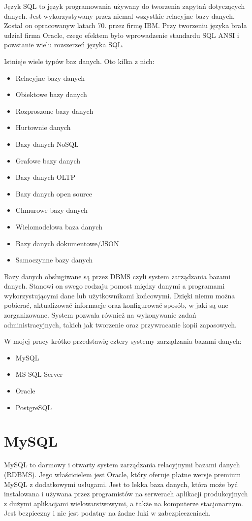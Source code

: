 \documentclass[oneside,polski,logo,indent]{amuthesis}
\begin{document}
Język SQL to język programowania używany do tworzenia zapytań dotyczących danych. Jest wykorzystywany przez niemal wszystkie relacyjne bazy danych. Został on opracowany\break w latach 70. przez firmę IBM. Przy tworzeniu języka brała udział firma Oracle, czego efektem było wprowadzenie standardu SQL ANSI i powstanie wielu rozszerzeń języka SQL.  

Istnieje wiele typów baz danych. Oto kilka z nich:  
\begin{itemize}
\item Relacyjne bazy danych
\item Obiektowe bazy danych
\item Rozproszone bazy danych
\item Hurtownie danych
\item Bazy danych NoSQL
\item Grafowe bazy danych
\item Bazy danych OLTP
\item Bazy danych open source
\item Chmurowe bazy danych
\item Wielomodelowa baza danych
\item Bazy danych dokumentowe/JSON
\item Samoczynne bazy danych
\end{itemize}

Bazy danych obsługiwane są przez DBMS czyli system zarządzania bazami danych. Stanowi on swego rodzaju pomost między danymi a programami wykorzystującymi dane lub użytkownikami końcowymi. Dzięki niemu można pobierać, aktualizować informacje oraz konfigurować sposób, w jaki są one zorganizowane. System pozwala również na wykonywanie zadań administracyjnych, takich jak tworzenie oraz przywracanie kopii zapasowych.


W mojej pracy krótko przedstawię cztery systemy zarządzania bazami danych: 
\begin{itemize}
\item MySQL 
\item MS SQL Server 
\item Oracle 
\item PostgreSQL 
\end{itemize}
\section{MySQL}
MySQL to darmowy i otwarty system zarządzania relacyjnymi bazami danych (RDBMS). Jego właścicielem jest Oracle, który oferuje płatne wersje premium MySQL z dodatkowymi usługami. Jest to lekka baza danych, która może być instalowana i używana przez programistów na serwerach aplikacji produkcyjnych z dużymi aplikacjami wielowarstwowymi, a także na komputerze stacjonarnym. Jest bezpieczny i nie jest podatny na żadne luki w zabezpieczeniach. 
\end{document}
